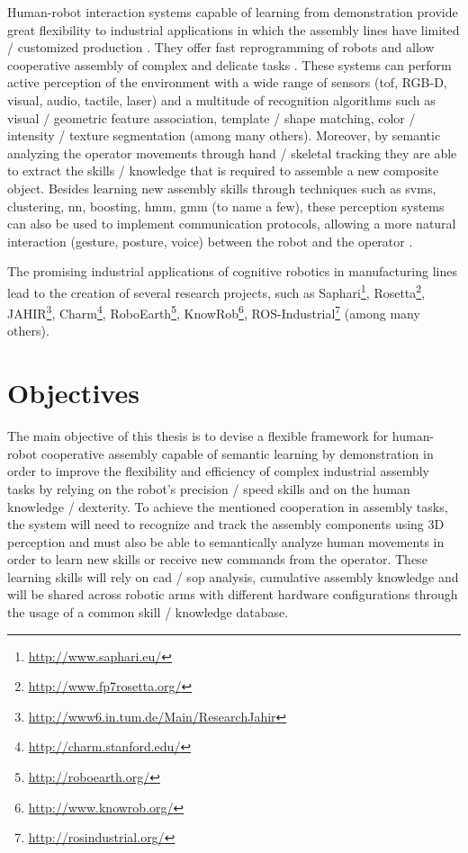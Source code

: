 Human-robot interaction systems capable of learning from demonstration provide great flexibility to industrial applications in which the assembly lines have limited / customized production \cite{Patel2012}. They offer fast reprogramming of robots and allow cooperative assembly of complex and delicate tasks \cite{Sumi2009,Edsinger2007}. These systems can perform active perception of the environment \cite{Yan2014,Goodrich2007} with a wide range of sensors (\gls{tof}, RGB-D, visual, audio, tactile, laser) and a multitude of recognition algorithms such as visual / geometric feature association, template / shape matching, color / intensity / texture segmentation (among many others). Moreover, by semantic analyzing the operator movements \cite{Roitberg2014} through hand / skeletal tracking they are able to extract the skills / knowledge \cite{Nikolaidis14,Goto2013} that is required to assemble a new composite object. Besides learning new assembly skills through techniques such as \glspl{svm}, clustering, \gls{nn}, boosting, \gls{hmm}, \gls{gmm} (to name a few), these perception systems can also be used to implement communication protocols, allowing a more natural interaction (gesture, posture, voice) between the robot and the operator \cite{Gleeson2013,Calisgan2012,Haddadi2013}.

The promising industrial applications of cognitive robotics in manufacturing lines lead to the creation of several research projects, such as Saphari\footnote{\url{http://www.saphari.eu/}}, Rosetta\footnote{\url{http://www.fp7rosetta.org/}}, JAHIR\footnote{\url{http://www6.in.tum.de/Main/ResearchJahir}}, Charm\footnote{\url{http://charm.stanford.edu/}}, RoboEarth\footnote{\url{http://roboearth.org/}}, KnowRob\footnote{\url{http://www.knowrob.org/}}, ROS-Industrial\footnote{\url{http://rosindustrial.org/}} (among many others).



\section{Objectives}

The main objective of this thesis is to devise a flexible framework for human-robot cooperative assembly capable of semantic learning by demonstration in order to improve the flexibility and efficiency of complex industrial assembly tasks by relying on the robot's precision / speed skills and on the human knowledge / dexterity. To achieve the mentioned cooperation in assembly tasks, the system will need to recognize and track the assembly components using 3D perception and must also be able to semantically analyze human movements in order to learn new skills or receive new commands from the operator. These learning skills will rely on \gls{cad} / \gls{sop} analysis, cumulative assembly knowledge and will be shared across robotic arms with different hardware configurations through the usage of a common skill / knowledge database.

